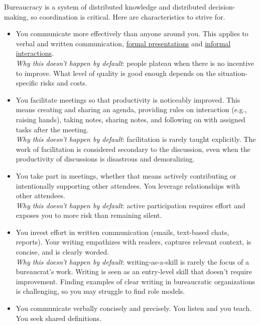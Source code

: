 Bureaucracy is a system of distributed knowledge and distributed decision-making, so coordination is critical. Here are characteristics to strive for. 
\begin{itemize}
    \item You communicate more effectively than anyone around you. This applies to verbal and written communication, \hyperref[sec:effective-presentations]{formal presentations} 
    and \hyperref[sec:walk-arounds]{informal interactions}. \\
    \textit{Why this doesn't happen by default}: people plateau when there is no incentive to improve. What level of quality is good enough depends on the situation-specific risks and costs.
    \item You facilitate meetings so that productivity is noticeably improved. This means creating and sharing an agenda, providing rules on interaction (e.g., raising hands), taking notes, sharing notes, and following on with assigned tasks after the meeting.\\
    \textit{Why this doesn't happen by default}: facilitation is rarely taught explicitly. The work of facilitation is considered secondary to the discussion, even when the productivity of discussions is disastrous and demoralizing. 
    \item You take part in meetings, whether that means actively contributing or intentionally supporting other attendees. You leverage relationships with other attendees.\\ 
    \textit{Why this doesn't happen by default}: active participation requires effort and exposes you to more risk than remaining silent.
    \item You invest effort in written communication (emails, text-based chats, reports). Your writing empathizes with readers, captures relevant context, is concise, and is clearly worded.\\
    \textit{Why this doesn't happen by default}: writing-as-a-skill is rarely the focus of a bureaucrat's work. Writing is seen as an entry-level skill that doesn't require improvement. Finding examples of clear writing in bureaucratic organizations is challenging, so you may struggle to find role models. 
    \item You communicate verbally concisely and precisely. You listen and you teach. You seek shared definitions. \\

\end{itemize}
